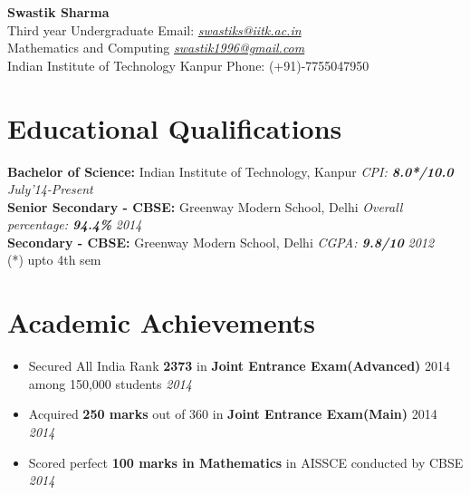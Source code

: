 \documentclass[11pt,a4paper]{article}
\begin{document}
\textbf{\huge{Swastik Sharma}}\\ 
Third year Undergraduate    \hfill Email: \href{mailto:swastiks@iitk.ac.in}{\textit{swastiks@iitk.ac.in}}\\
Mathematics and Computing    \hfill  \href{mailto:swastik1996@gmail.com}{\textit{swastik1996@gmail.com}}\\
Indian Institute of Technology Kanpur \hfill Phone: (+91)-7755047950
\vspace{-0.4cm}

\section*{Educational Qualifications}
\vspace{-0.1cm}

\textbf{\large{Bachelor of Science:}} Indian Institute of Technology, Kanpur \emph	{CPI: \textbf{8.0*/10.0} } \hfill\textit{July'14-Present}\vspace{0.1cm}\\
\textbf{\large{Senior Secondary - CBSE:}} Greenway Modern School, Delhi \emph{Overall percentage: \textbf{94.4\%}} \hfill\textit{2014}\vspace{0.1cm}\\
\textbf{\large{Secondary - CBSE:}} Greenway Modern School, Delhi \emph{CGPA: \textbf{9.8/10}} \hfill\textit{2012}
\vspace{0.1cm}\\
(*) upto 4th sem
\vspace{-0.4cm}
\section*{Academic Achievements}
\vspace{-0.2cm}
\begin{itemize}

\item Secured All India Rank \textbf{2373} in \textbf{Joint Entrance Exam(Advanced)} 2014 among 150,000 students          	\hfill \textit{2014}\vspace{0.1cm}
\item Acquired \textbf{250 marks} out of 360 in \textbf{Joint Entrance Exam(Main)} 2014      	\hfill \textit{2014}\vspace{0.1cm}
\item Scored perfect \textbf{100 marks in Mathematics} in AISSCE conducted by CBSE \hfill \textit{2014}\vspace{0.1cm}


\end{itemize}
\vspace{-0.4cm}
\end{document}
